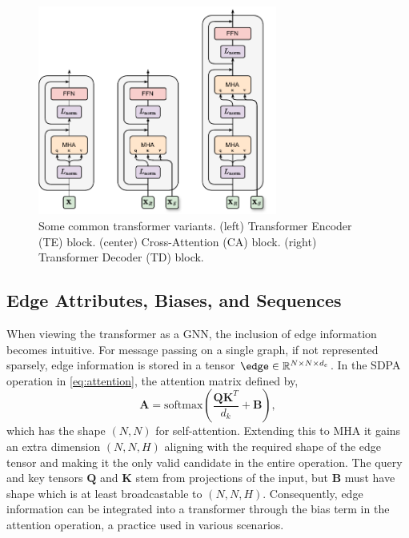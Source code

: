 \begin{figure}
    \centering
    \includegraphics[width=0.7\textwidth]{Figures/graph_networks/transformer_variants.pdf}
    \caption{Some common transformer variants. (left) Transformer Encoder (TE) block. (center) Cross-Attention (CA) block. (right) Transformer Decoder (TD) block.}
    \label{fig:transformer_blocks}
\end{figure}

\subsection{Edge Attributes, Biases, and Sequences}
\label{sec:edge_biases_sequences}

When viewing the transformer as a GNN, the inclusion of edge information becomes intuitive.
For message passing on a single graph, if not represented sparsely, edge information is stored in a tensor $\edge \in \mathbb{R}^{N \times N \times d_e}$.
In the SDPA operation in \cref{eq:attention}, the attention matrix defined by,
\begin{equation}
    \mathbf{A} = \text{softmax}\left( \frac{\mathbf{Q} \mathbf{K}^T}{d_k} + \mathbf{B} \right),
\end{equation}
which has the shape $(N, N)$ for self-attention.
Extending this to MHA it gains an extra dimension $(N, N, H)$ aligning with the required shape of the edge tensor and making it the only valid candidate in the entire operation.
The query and key tensors $\mathbf{Q}$ and $\mathbf{K}$ stem from projections of the input, but $\mathbf{B}$ must have shape which is at least broadcastable to $(N, N, H)$.
Consequently, edge information can be integrated into a transformer through the bias term in the attention operation, a practice used in various scenarios.


